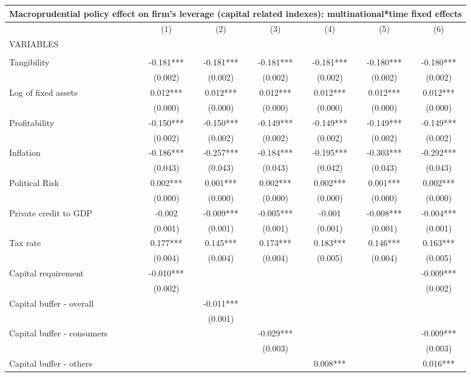 \begin{tabular}{lcccccc}
\multicolumn{7}{c}{Macroprudential policy effect on firm's leverage (capital related indexes): multinational*time fixed effects} \\ \hline
 & (1) & (2) & (3) & (4) & (5) & (6) \\
VARIABLES &  &  &  &  &  &  \\ \hline
 &  &  &  &  &  &  \\
Tangibility & -0.181*** & -0.181*** & -0.181*** & -0.181*** & -0.180*** & -0.180*** \\
 & (0.002) & (0.002) & (0.002) & (0.002) & (0.002) & (0.002) \\
Log of fixed assets & 0.012*** & 0.012*** & 0.012*** & 0.012*** & 0.012*** & 0.012*** \\
 & (0.000) & (0.000) & (0.000) & (0.000) & (0.000) & (0.000) \\
Profitability & -0.150*** & -0.150*** & -0.149*** & -0.149*** & -0.149*** & -0.149*** \\
 & (0.002) & (0.002) & (0.002) & (0.002) & (0.002) & (0.002) \\
Inflation & -0.186*** & -0.257*** & -0.184*** & -0.195*** & -0.303*** & -0.292*** \\
 & (0.043) & (0.043) & (0.043) & (0.042) & (0.043) & (0.043) \\
Political Risk & 0.002*** & 0.001*** & 0.002*** & 0.002*** & 0.001*** & 0.002*** \\
 & (0.000) & (0.000) & (0.000) & (0.000) & (0.000) & (0.000) \\
Private credit to GDP & -0.002 & -0.009*** & -0.005*** & -0.001 & -0.008*** & -0.004*** \\
 & (0.001) & (0.001) & (0.001) & (0.001) & (0.001) & (0.001) \\
Tax rate & 0.177*** & 0.145*** & 0.173*** & 0.183*** & 0.146*** & 0.163*** \\
 & (0.004) & (0.004) & (0.004) & (0.005) & (0.004) & (0.005) \\
Capital requirement & -0.010*** &  &  &  &  & -0.009*** \\
 & (0.002) &  &  &  &  & (0.002) \\
Capital buffer - overall &  & -0.011*** &  &  &  &  \\
 &  & (0.001) &  &  &  &  \\
Capital buffer - consumers &  &  & -0.029*** &  &  & -0.009*** \\
 &  &  & (0.003) &  &  & (0.003) \\
Capital buffer - others &  &  &  & 0.008*** &  & 0.016*** \\

\end{tabular}
